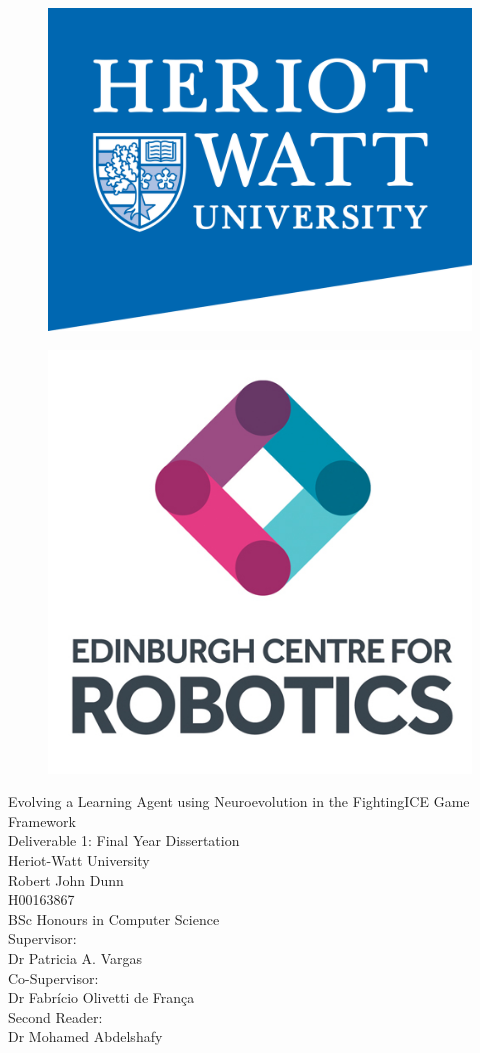 \documentclass[11pt,a4paper]{article}
\begin{document}
\thispagestyle{empty}
\begin{figure}
\centering
\begin{minipage}{.5\textwidth}
  \centering
  \includegraphics[width=.6\linewidth]{hwlogo}
  \label{fig:test1}
\end{minipage}%
\begin{minipage}{.5\textwidth}
  \centering
  \includegraphics[width=.6\linewidth]{hwrobotics}
  \label{fig:test2}
\end{minipage}
\end{figure}
{
\centering
\vspace{10mm}
{\huge Evolving a Learning Agent using Neuroevolution in the FightingICE Game Framework}\\
\vspace{20mm}
{\large Deliverable 1: Final Year Dissertation}\\
{\large Heriot-Watt University}\\
\vspace{10mm}
{\large Robert John Dunn\\
H00163867\\
BSc Honours in Computer Science\\
\vspace{10mm}
Supervisor:\\
Dr Patricia A. Vargas\vspace{3mm}\\
Co-Supervisor:\\
Dr Fabrício Olivetti de França\vspace{3mm}\\
Second Reader:\\
Dr Mohamed Abdelshafy\\}
}
\newpage
\thispagestyle{empty}
\vspace*{30mm}
\end{document}

